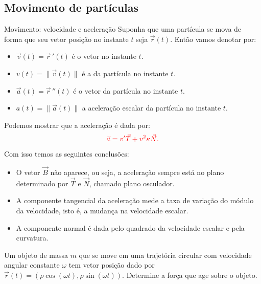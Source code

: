 \subsection*{Movimento de partículas}
\begin{frame}[label=fun-vet]{Movimento: velocidade e aceleração}
	Suponha que uma partícula se mova de forma que seu vetor posição no instante $t$ seja $\vec{r}(t)$. Então vamos denotar por:
	\begin{itemize}
		\item $\vec{v}(t)=\vec{r}\,'(t)$ é o vetor  no instante $t$.
		\item $v(t)=\|\vec{v}(t)\|$ é a  da partícula no instante $t$.
		\item $\vec{a}(t)=\vec{r}\,''(t)$ é o vetor  da partícula no instante $t$.
		\item $a(t)=\|\vec{a}(t)\|$ a aceleração escalar da partícula no instante $t$.
	\end{itemize}

\end{frame}


\begin{frame}[label=fun-vet]
Podemos mostrar que  a aceleração é dada por:
\[{\color{red}\vec{a}=v'\vec{T}+v^2\kappa \vec{N}. }\]
Com isso temos as seguintes conclusões:
\begin{itemize}
\item O vetor $\vec{B}$ não aparece, ou seja, a aceleração sempre está no plano determinado por $\vec{T}$ e $\vec{N}$, chamado {\color{blue} plano osculador}.


\item A componente tangencial da aceleração mede a taxa de variação do módulo da  velocidade, isto é, a mudança na velocidade escalar.

\item A componente normal é dada pelo quadrado da velocidade escalar e pela curvatura.
\end{itemize}

\begin{exe}
Um objeto de massa $m$ que se move em uma trajetória circular com velocidade angular constante $\omega$ tem vetor posição dado por $\vec{r}(t)=(\rho\cos (\omega t), \rho\sin (\omega t)).$ Determine a força que age sobre o objeto.
\end{exe}
\end{frame}


